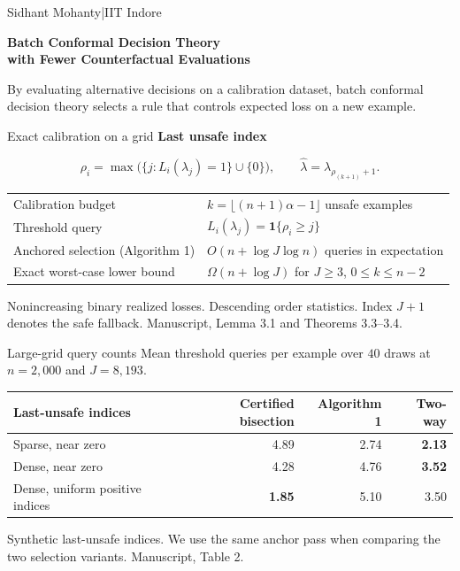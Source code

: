 \documentclass[aspectratio=169,11pt]{beamer}
\newcommand{\source}[1]{\vfill{\scriptsize\color{ink!75}#1}}
\begin{document}
\begin{frame}[plain]
\begin{flushleft}
{\color{accent}Sidhant Mohanty\quad|\quad IIT Indore}\par\vspace{7mm}
{\LARGE\bfseries Batch Conformal Decision Theory\\[1.5mm]with Fewer Counterfactual Evaluations}\par\vspace{7mm}
{\large By evaluating alternative decisions on a calibration dataset, batch conformal decision theory selects a rule that controls expected loss on a new example.}
\end{flushleft}
\end{frame}
\begin{frame}{Exact calibration on a grid}
{\large\textbf{Last unsafe index}}\par
\[
 \rho_i=\max\bigl(\{j:L_i(\lambda_j)=1\}\cup\{0\}\bigr),\qquad
 \widehat\lambda=\lambda_{\rho_{(k+1)}+1}.
\]
\smallskip
\begin{tabular}{@{}ll@{}}
Calibration budget & $k=\lfloor(n+1)\alpha-1\rfloor$ unsafe examples\\
Threshold query & $L_i(\lambda_j)=\mathbf1\{\rho_i\ge j\}$\\
Anchored selection (Algorithm 1) & $O(n+\log J\log n)$ queries in expectation\\
Exact worst-case lower bound & $\Omega(n+\log J)$ for $J\ge3$, $0\le k\le n-2$\\
\end{tabular}
\source{Nonincreasing binary realized losses. Descending order statistics. Index $J+1$ denotes the safe fallback. Manuscript, Lemma 3.1 and Theorems 3.3--3.4.}
\end{frame}
\begin{frame}{Large-grid query counts}
\large Mean threshold queries per example over $40$ draws at $n=2{,}000$ and $J=8{,}193$.\par\vspace{6mm}
\centering\normalsize\renewcommand{\arraystretch}{1.5}
\begin{tabular}{@{}lrrr@{}}\toprule
Last-unsafe indices & Certified bisection & Algorithm 1 & Two-way\\\midrule
Sparse, near zero & 4.89 & 2.74 & \textbf{2.13}\\
Dense, near zero & 4.28 & 4.76 & \textbf{3.52}\\
Dense, uniform positive indices & \textbf{1.85} & 5.10 & 3.50\\\bottomrule
\end{tabular}
\par\raggedright\source{Synthetic last-unsafe indices. We use the same anchor pass when comparing the two selection variants. Manuscript, Table 2.}
\end{frame}
\end{document}
